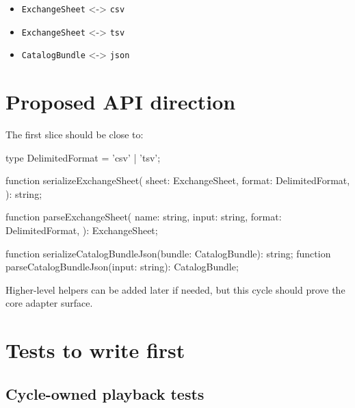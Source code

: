 \begin{itemize}
\tightlist
\item
  \texttt{E\allowbreak{}x\allowbreak{}c\allowbreak{}h\allowbreak{}a\allowbreak{}n\allowbreak{}g\allowbreak{}e\allowbreak{}S\allowbreak{}h\allowbreak{}e\allowbreak{}e\allowbreak{}t} \textless-\textgreater{} \texttt{c\allowbreak{}s\allowbreak{}v}
\item
  \texttt{E\allowbreak{}x\allowbreak{}c\allowbreak{}h\allowbreak{}a\allowbreak{}n\allowbreak{}g\allowbreak{}e\allowbreak{}S\allowbreak{}h\allowbreak{}e\allowbreak{}e\allowbreak{}t} \textless-\textgreater{} \texttt{t\allowbreak{}s\allowbreak{}v}
\item
  \texttt{C\allowbreak{}a\allowbreak{}t\allowbreak{}a\allowbreak{}l\allowbreak{}o\allowbreak{}g\allowbreak{}B\allowbreak{}u\allowbreak{}n\allowbreak{}d\allowbreak{}l\allowbreak{}e} \textless-\textgreater{} \texttt{j\allowbreak{}s\allowbreak{}o\allowbreak{}n}
\end{itemize}

\section{Proposed API direction}\label{record-191-proposed-api-direction}

The first slice should be close to:

\begin{CodeBlock}
type DelimitedFormat = 'csv' | 'tsv';

function serializeExchangeSheet(
  sheet: ExchangeSheet,
  format: DelimitedFormat,
): string;

function parseExchangeSheet(
  name: string,
  input: string,
  format: DelimitedFormat,
): ExchangeSheet;

function serializeCatalogBundleJson(bundle: CatalogBundle): string;
function parseCatalogBundleJson(input: string): CatalogBundle;
\end{CodeBlock}

Higher-level helpers can be added later if needed, but this cycle should prove the core adapter surface.

\section{Tests to write first}\label{record-191-tests-to-write-first}

\subsection{Cycle-owned playback tests}\label{record-191-cycle-owned-playback-tests}

